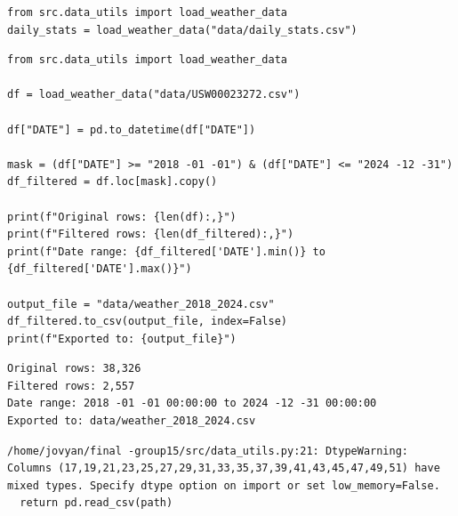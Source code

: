 \documentclass{article}
\begin{document}
\begin{verbatim}
from src.data_utils import load_weather_data
daily_stats = load_weather_data("data/daily_stats.csv")
\end{verbatim}

\begin{verbatim}
from src.data_utils import load_weather_data

df = load_weather_data("data/USW00023272.csv")

df["DATE"] = pd.to_datetime(df["DATE"])

mask = (df["DATE"] >= "2018 -01 -01") & (df["DATE"] <= "2024 -12 -31")
df_filtered = df.loc[mask].copy()

print(f"Original rows: {len(df):,}")
print(f"Filtered rows: {len(df_filtered):,}")
print(f"Date range: {df_filtered['DATE'].min()} to {df_filtered['DATE'].max()}")

output_file = "data/weather_2018_2024.csv"
df_filtered.to_csv(output_file, index=False)
print(f"Exported to: {output_file}")
\end{verbatim}

\begin{verbatim}
Original rows: 38,326
Filtered rows: 2,557
Date range: 2018 -01 -01 00:00:00 to 2024 -12 -31 00:00:00
Exported to: data/weather_2018_2024.csv
\end{verbatim}

\begin{verbatim}
/home/jovyan/final -group15/src/data_utils.py:21: DtypeWarning: Columns (17,19,21,23,25,27,29,31,33,35,37,39,41,43,45,47,49,51) have mixed types. Specify dtype option on import or set low_memory=False.
  return pd.read_csv(path)
\end{verbatim}
\end{document}
